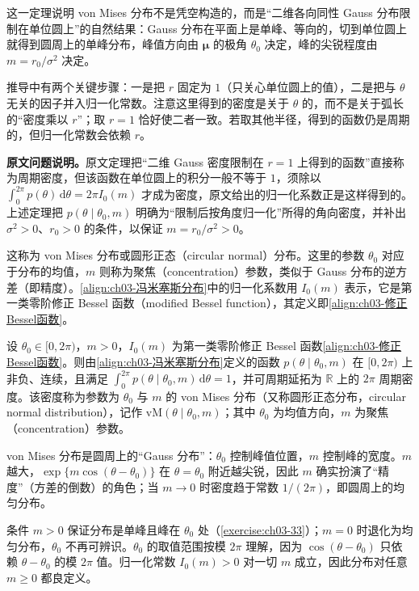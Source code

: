 \documentclass[../../main.tex]{subfiles}
\begin{document}
\begin{remark}
这一定理说明 von Mises 分布不是凭空构造的，而是“二维各向同性 Gauss 分布限制在单位圆上”的自然结果：Gauss 分布在平面上是单峰、等向的，切到单位圆上就得到圆周上的单峰分布，峰值方向由 $\boldsymbol{\mu}$ 的极角 $\theta_0$ 决定，峰的尖锐程度由 $m=r_0/\sigma^{2}$ 决定。

推导中有两个关键步骤：一是把 $r$ 固定为 $1$（只关心单位圆上的值），二是把与 $\theta$ 无关的因子并入归一化常数。注意这里得到的密度是关于 $\theta$ 的，而不是关于弧长的“密度乘以 $r$”；取 $r=1$ 恰好使二者一致。若取其他半径，得到的函数仍是周期的，但归一化常数会依赖 $r$。

\textbf{原文问题说明。}原文定理把“二维 Gauss 密度限制在 $r=1$ 上得到的函数”直接称为周期密度，但该函数在单位圆上的积分一般不等于 $1$，须除以 $\int_{0}^{2\pi}p(\theta)\,\mathrm{d}\theta=2\pi I_0(m)$ 才成为密度，原文给出的归一化系数正是这样得到的。上述定理把 $p(\theta\mid\theta_0,m)$ 明确为“限制后按角度归一化”所得的角向密度，并补出 $\sigma^{2}>0$、$r_0>0$ 的条件，以保证 $m=r_0/\sigma^{2}>0$。
\end{remark}

这称为 von Mises 分布或圆形正态（circular normal）分布。这里的参数 $\theta_0$ 对应于分布的均值，$m$ 则称为聚焦（concentration）参数，类似于 Gauss 分布的逆方差（即精度）。\eqref{align:ch03-冯米塞斯分布}中的归一化系数用 $I_0(m)$ 表示，它是第一类零阶修正 Bessel 函数（modified Bessel function），其定义即\eqref{align:ch03-修正Bessel函数}。

\begin{definition}\label{definition:ch03-冯米塞斯分布}
设 $\theta_0\in[0,2\pi)$，$m>0$，$I_0(m)$ 为第一类零阶修正 Bessel 函数\eqref{align:ch03-修正Bessel函数}。则由\eqref{align:ch03-冯米塞斯分布}定义的函数 $p(\theta\mid\theta_0,m)$ 在 $[0,2\pi)$ 上非负、连续，且满足 $\int_{0}^{2\pi}p(\theta\mid\theta_0,m)\,\mathrm{d}\theta=1$，并可周期延拓为 $\mathbb{R}$ 上的 $2\pi$ 周期密度。该密度称为参数为 $\theta_0$ 与 $m$ 的 von Mises 分布（又称圆形正态分布，circular normal distribution），记作 $\mathrm{vM}(\theta\mid\theta_0,m)$；其中 $\theta_0$ 为均值方向，$m$ 为聚焦（concentration）参数。
\end{definition}

\begin{remark}
von Mises 分布是圆周上的“Gauss 分布”：$\theta_0$ 控制峰值位置，$m$ 控制峰的宽度。$m$ 越大，$\exp\{m\cos(\theta-\theta_0)\}$ 在 $\theta=\theta_0$ 附近越尖锐，因此 $m$ 确实扮演了“精度”（方差的倒数）的角色；当 $m\to0$ 时密度趋于常数 $1/(2\pi)$，即圆周上的均匀分布。

条件 $m>0$ 保证分布是单峰且峰在 $\theta_0$ 处（\cref{exercise:ch03-33}）；$m=0$ 时退化为均匀分布，$\theta_0$ 不再可辨识。$\theta_0$ 的取值范围按模 $2\pi$ 理解，因为 $\cos(\theta-\theta_0)$ 只依赖 $\theta-\theta_0$ 的模 $2\pi$ 值。归一化常数 $I_0(m)>0$ 对一切 $m$ 成立，因此分布对任意 $m\geqslant0$ 都良定义。
\end{remark}
\end{document}
